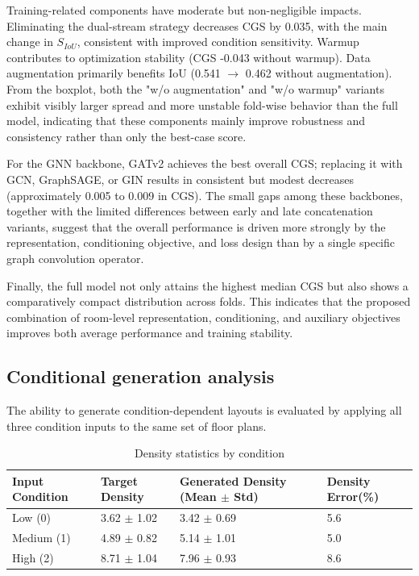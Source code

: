Training-related components have moderate but non-negligible impacts. Eliminating the dual-stream strategy decreases CGS by 0.035, with the main change in $S_{IoU}$, consistent with improved condition sensitivity. Warmup contributes to optimization stability (CGS -0.043 without warmup). Data augmentation primarily benefits IoU (0.541 $\rightarrow$ 0.462 without augmentation). From the boxplot, both the "w/o augmentation" and "w/o warmup" variants exhibit visibly larger spread and more unstable fold-wise behavior than the full model, indicating that these components mainly improve robustness and consistency rather than only the best-case score.

For the GNN backbone, GATv2 achieves the best overall CGS; replacing it with GCN, GraphSAGE, or GIN results in consistent but modest decreases (approximately 0.005 to 0.009 in CGS). The small gaps among these backbones, together with the limited differences between early and late concatenation variants, suggest that the overall performance is driven more strongly by the representation, conditioning objective, and loss design than by a single specific graph convolution operator.

Finally, the full model not only attains the highest median CGS but also shows a comparatively compact distribution across folds. This indicates that the proposed combination of room-level representation, conditioning, and auxiliary objectives improves both average performance and training stability.



\subsection{Conditional generation analysis}
\label{subsec:conditional_analysis}

The ability to generate condition-dependent layouts is evaluated by applying all three condition inputs to the same set of floor plans.

\begin{table}[t]
\centering
\caption{Density statistics by condition}
\label{tab:density_stats}
\begin{tabularx}{\textwidth}{XXXX}
\toprule
Input Condition & Target Density & Generated Density \newline (Mean $\pm$ Std) & Density Error(\%) \\
\midrule
Low (0) & 3.62 $\pm$ 1.02 & 3.42 $\pm$ 0.69 & 5.6 \\
Medium (1) & 4.89 $\pm$ 0.82 & 5.14 $\pm$ 1.01 & 5.0 \\
High (2) & 8.71 $\pm$ 1.04 & 7.96 $\pm$ 0.93 & 8.6 \\
\bottomrule
\end{tabularx}
\end{table}

